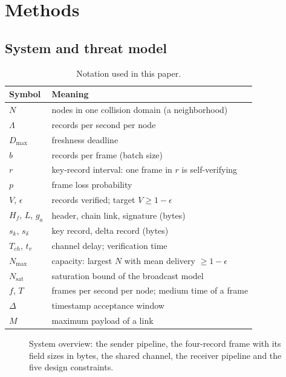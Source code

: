 \documentclass[lineno,pdflatex,sn-mathphys-num]{sn-jnl}
\newcommand{\ba}{\ensuremath{g_a}}
\renewcommand{\_}{\authbcunderscore\allowbreak}
\begin{document}
\section{Methods}\label{sec:methods}

\subsection{System and threat model}\label{sec:model}

\begin{table}[t]\centering
\caption{Notation used in this paper.}
\label{tab:notation}
\setlength{\tabcolsep}{3pt}
\begin{tabular}{l l}
\toprule
\textbf{Symbol} & \textbf{Meaning} \\
\midrule
$N$ & nodes in one collision domain (a neighborhood) \\
$\Lambda$ & records per second per node \\
$D_{\max}$ & freshness deadline \\
$b$ & records per frame (batch size) \\
$r$ & key-record interval: one frame in $r$ is self-verifying \\
$p$ & frame loss probability \\
$V$, $\epsilon$ & records verified; target $V \geq 1-\epsilon$ \\
$H_f$, $L$, \ba & header, chain link, signature (bytes) \\
$s_k$, $s_\delta$ & key record, delta record (bytes) \\
$T_{ch}$, $t_v$ & channel delay; verification time \\
$N_{\max}$ & capacity: largest $N$ with mean delivery $\geq 1-\epsilon$ \\
$N_{\mathrm{sat}}$ & saturation bound of the broadcast model \\
$f$, $T$ & frames per second per node; medium time of a frame \\
$\Delta$ & timestamp acceptance window \\
$M$ & maximum payload of a link \\
\bottomrule
\end{tabular}
\end{table}

\begin{figure}[t]\centering

\caption{System overview: the sender pipeline, the four-record frame with its field sizes in
bytes, the shared channel, the receiver pipeline and the five design constraints.}
\label{fig:system}
\end{figure}
\end{document}
